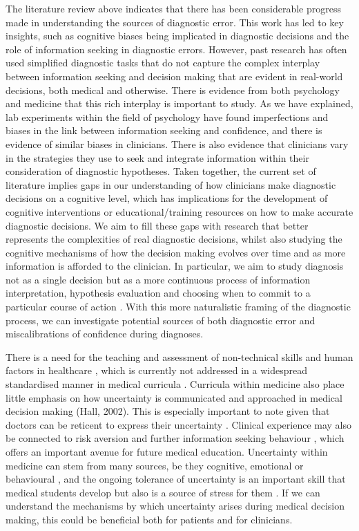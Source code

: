 \documentclass[a4paper, nobind]{templates/ociamthesis}
\begin{document}
The literature review above indicates that there has been considerable progress made in understanding the sources of diagnostic error. This work has led to key insights, such as cognitive biases being implicated in diagnostic decisions and the role of information seeking in diagnostic errors. However, past research has often used simplified diagnostic tasks that do not capture the complex interplay between information seeking and decision making that are evident in real-world decisions, both medical and otherwise. There is evidence from both psychology and medicine that this rich interplay is important to study. As we have explained, lab experiments within the field of psychology have found imperfections and biases in the link between information seeking and confidence, and there is evidence of similar biases in clinicians. There is also evidence that clinicians vary in the strategies they use to seek and integrate information within their consideration of diagnostic hypotheses. Taken together, the current set of literature implies gaps in our understanding of how clinicians make diagnostic decisions on a cognitive level, which has implications for the development of cognitive interventions or educational/training resources on how to make accurate diagnostic decisions. We aim to fill these gaps with research that better represents the complexities of real diagnostic decisions, whilst also studying the cognitive mechanisms of how the decision making evolves over time and as more information is afforded to the clinician. In particular, we aim to study diagnosis not as a single decision but as a more continuous process of information interpretation, hypothesis evaluation and choosing when to commit to a particular course of action \autocite{alby_diagnostic_2015}. With this more naturalistic framing of the diagnostic process, we can investigate potential sources of both diagnostic error and miscalibrations of confidence during diagnoses.

\hfill\break
There is a need for the teaching and assessment of non-technical skills and human factors in healthcare \autocite{higham_observer-based_2019}, which is currently not addressed in a widespread standardised manner in medical curricula \autocite{greig_lack_2015}. Curricula within medicine also place little emphasis on how uncertainty is communicated and approached in medical decision making (Hall, 2002). This is especially important to note given that doctors can be reticent to express their uncertainty \autocite{katz_why_1984}. Clinical experience may also be connected to risk aversion and further information seeking behaviour \autocite{lawton_are_2019}, which offers an important avenue for future medical education. Uncertainty within medicine can stem from many sources, be they cognitive, emotional or behavioural \autocite{han_varieties_2011,lee_towards_2021}, and the ongoing tolerance of uncertainty is an important skill that medical students develop but also is a source of stress for them \autocite{hancock_tolerance_2020,stephens_exploring_2021}. If we can understand the mechanisms by which uncertainty arises during medical decision making, this could be beneficial both for patients and for clinicians.
\end{document}
